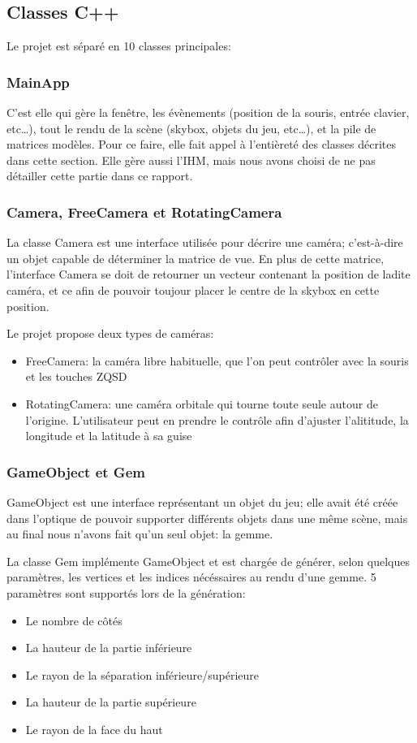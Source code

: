 \documentclass[a4paper,12pt]{article}
\begin{document}
\subsection{Classes C++}
Le projet est séparé en 10 classes principales:

\subsubsection{MainApp}
C'est elle qui gère la fenêtre, les évènements (position de la souris, entrée clavier, etc\ldots), tout le
rendu de la scène (skybox, objets du jeu, etc\ldots), et la pile de matrices modèles.
Pour ce faire, elle fait appel à l'entièreté des classes décrites dans cette section. Elle gère aussi l'IHM,
mais nous avons choisi de ne pas détailler cette partie dans ce rapport.

\subsubsection{Camera, FreeCamera et RotatingCamera}
La classe Camera est une interface utilisée pour décrire une caméra; c'est-à-dire un objet capable de déterminer
la matrice de vue. En plus de cette matrice, l'interface Camera se doit de retourner un vecteur contenant la
position de ladite caméra, et ce afin de pouvoir toujour placer le centre de la skybox en cette position.

Le projet propose deux types de caméras:
\begin{itemize}
    \item FreeCamera: la caméra libre habituelle, que l'on peut contrôler avec la souris et les touches ZQSD
    \item RotatingCamera: une caméra orbitale qui tourne toute seule autour de l'origine. L'utilisateur peut en prendre le contrôle afin d'ajuster l'alititude, la longitude et la latitude à sa guise
\end{itemize}

\subsubsection{GameObject et Gem}
GameObject est une interface représentant un objet du jeu; elle avait été créée dans l'optique de pouvoir supporter
différents objets dans une même scène, mais au final nous n'avons fait qu'un seul objet: la gemme.

La classe Gem implémente GameObject et est chargée de générer, selon quelques paramètres, les vertices et les indices
nécéssaires au rendu d'une gemme. 5 paramètres sont supportés lors de la génération:
\begin{itemize}
    \item Le nombre de côtés
    \item La hauteur de la partie inférieure
    \item Le rayon de la séparation inférieure/supérieure
    \item La hauteur de la partie supérieure
    \item Le rayon de la face du haut
\end{itemize}
\end{document}
